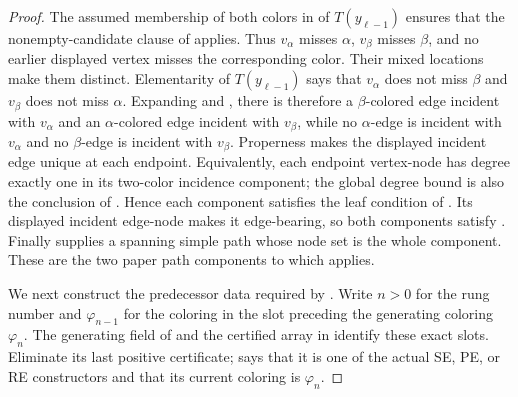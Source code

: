 \begin{proof}
The assumed membership of both colors in
 of $T(y_{\ell-1})$ ensures that the
nonempty-candidate clause of 
applies.  Thus $v_\alpha$ misses $\alpha$, $v_\beta$ misses $\beta$, and
no earlier displayed vertex misses the corresponding color.  Their mixed
locations make them distinct.  Elementarity of $T(y_{\ell-1})$ says that
$v_\alpha$ does not miss $\beta$ and $v_\beta$ does not miss $\alpha$.
Expanding  and , there is
therefore a $\beta$-colored edge incident with $v_\alpha$ and an
$\alpha$-colored edge incident with $v_\beta$, while no $\alpha$-edge is
incident with $v_\alpha$ and no $\beta$-edge is incident with $v_\beta$.
Properness makes the displayed incident edge unique at each endpoint.
Equivalently, each endpoint vertex-node has degree exactly one in its
two-color incidence component; the global degree bound is also the
conclusion of .  Hence each
component satisfies the leaf condition of
.  Its displayed incident edge-node makes
it edge-bearing, so both components satisfy
.  Finally
 supplies a spanning simple path
whose node set is the whole component.  These are the two paper path
components to which  applies.

We next construct the predecessor data required by .
Write $n>0$ for the rung number and $\varphi_{n-1}$ for the coloring in
the slot preceding the generating coloring $\varphi_n$.  The generating
field of  and the certified array in
 identify these exact slots.  Eliminate its last
positive certificate;  says that it is one of
the actual SE, PE, or RE constructors and that its current coloring is
$\varphi_n$.


\end{proof}

